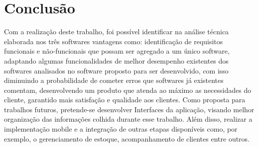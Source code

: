 \documentclass[12pt,openright,twoside,a4paper,english,french,spanish,brazil]{abntex2}
\begin{document}




\chapter*[Conclusão]{Conclusão}

Com a realização deste trabalho, foi possível identificar na análise técnica elaborada nos três softwares vantagens como: identificação de requisitos funcionais e não-funcionais que possam ser agregado a um único software, adaptando algumas funcionalidades de melhor desempenho existentes dos softwares analisados no software proposto para ser desenvolvido, com isso diminuindo a probabilidade de cometer erros que softwares já existentes comentam, desenvolvendo um produto que atenda ao máximo as necessidades do cliente, garantido mais satisfação e qualidade aos clientes.
Como proposta para trabalhos futuros, pretende-se desenvolver Interfaces da aplicação, visando melhor organização das informações colhida durante esse trabalho. Além disso, realizar a implementação mobile e a integração de outras etapas disponíveis como, por exemplo, o gerenciamento de estoque, acompanhamento de clientes entre outros.




%
%

\end{document}
